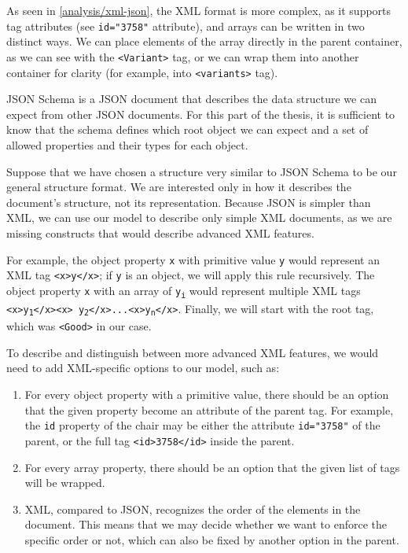 As seen in \autoref{analysis/xml-json}, the XML format is more complex, as it supports tag attributes (see \verb|id="3758"| attribute), and arrays can be written in two distinct ways. We can place elements of the array directly in the parent container, as we can see with the \verb|<Variant>| tag, or we can wrap them into another container for clarity (for example, into \verb|<variants>| tag).

\smallskip

JSON Schema is a JSON document that describes the data structure we can expect from other JSON documents. For this part of the thesis, it is sufficient to know that the schema defines which root object we can expect and a set of allowed properties and their types for each object.

Suppose that we have chosen a structure very similar to JSON Schema to be our general structure format. We are interested only in how it describes the document's structure, not its representation. Because JSON is simpler than XML, we can use our model to describe only simple XML documents, as we are missing constructs that would describe advanced XML features.

For example, the object property {\tt x} with primitive value {\tt y} would represent an XML tag {\tt <x>y</x>}; if {\tt y} is an object, we will apply this rule recursively.
The object property {\tt x} with an array of {\tt y\textsubscript{i}}  would represent multiple XML tags {\tt<x>y\textsubscript{1}</x><x>\nobreak\hfil{} \hfilneg y\textsubscript{2}</x>...<x>y\textsubscript{n}</x>}.
Finally, we will start with the root tag, which was {\tt <Good>} in our case.

To describe and distinguish between more advanced XML features, we would need to add XML-specific options to our model, such as:
\begin{enumerate}
  \item For every object property with a primitive value, there should be an option that the given property become an attribute of the parent tag. For example, the \verb|id| property of the chair may be either the attribute \verb|id="3758"| of the parent, or the full tag \verb|<id>3758</id>| inside the parent.
  \item For every array property, there should be an option that the given list of tags will be wrapped.
  \item XML, compared to JSON, recognizes the order of the elements in the document. This means that we may decide whether we want to enforce the specific order or not, which can also be fixed by another option in the parent.
\end{enumerate}


